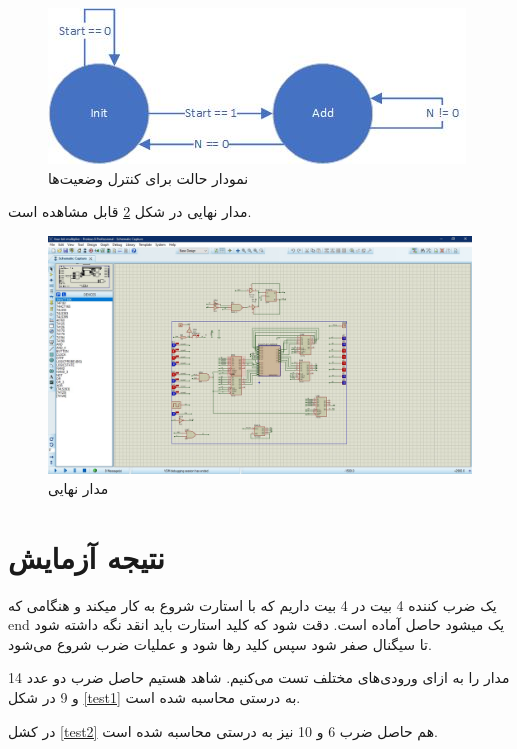 \documentclass[fleqn]{article}
\begin{document}
\begin{figure}[!htbp]
    \includegraphics[width=\textwidth]{Assets/state.jpg}
    \caption{نمودار حالت برای کنترل وضعیت‌ها}
    \label{state}
\end{figure}

مدار نهایی در شکل 
\ref{main}
قابل مشاهده است.

\begin{figure}[!htbp]
    \includegraphics[width=\textwidth]{Assets/maincirc.jpg}
    \caption{مدار نهایی}
    \label{main}
\end{figure}

\section{نتیجه آزمایش}
یک ضرب کننده 4 بیت در 4 بیت داریم که با استارت شروع به کار میکند و هنگامی که end 
یک میشود حاصل آماده است. دقت شود که کلید استارت باید انقد نگه داشته شود تا سیگنال 
صفر شود سپس کلید رها شود و عملیات ضرب شروع می‌شود.

مدار را به ازای ورودی‌های مختلف تست می‌کنیم. شاهد هستیم حاصل ضرب دو عدد 14 و 9 در شکل 
\ref{test1}
به درستی محاسبه شده است. 

در کشل 
\ref{test2}
هم حاصل ضرب 6 و 10 نیز به درستی محاسبه شده است.
\end{document}
